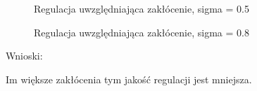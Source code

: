 \begin{figure}[H] 
    \centering
    
    \caption{Regulacja uwzględniająca zakłócenie, sigma = \num{0.5}}
    \label{projekt:zad7:regulacjaZUwzg:figureSigma0_5}
\end{figure}

\begin{figure}[H] 
    \centering
    
    \caption{Regulacja uwzględniająca zakłócenie, sigma = \num{0.8}}
    \label{projekt:zad7:regulacjaZUwzg:figureSigma0_8}
\end{figure}

Wnioski: 

Im większe zakłócenia tym jakość regulacji jest mniejsza.
